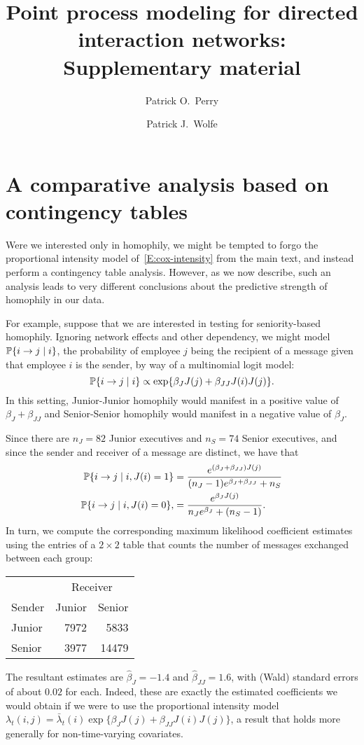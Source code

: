 \documentclass[final]{statsoc}
\title[Point Process Modeling for Directed Interaction Networks: Supplementary Material]{%
    Point process modeling for directed interaction networks: Supplementary material
}
\author[P.\ O.\ Perry]{%
    Patrick O.\ Perry
}
\author[P.\ J.\ Wolfe]{%
    Patrick J.\ Wolfe
}
\begin{document}

\section{A comparative analysis based on contingency tables}
\label{sec:contin-analysis}

Were we interested only in homophily, we might be tempted to forgo
the proportional intensity model of~\eqref{E:cox-intensity} from the main text, and instead
perform a contingency table analysis.  However, as we now describe,
such an analysis leads to very different conclusions
about the predictive strength of homophily in our data.

For example, suppose that we are interested in testing for seniority-based homophily.  Ignoring
network effects and other dependency, we might model $\mathbb{P}\{ i \to j \mid i
\}$, the probability of employee $j$ being the recipient of a message given
that employee $i$ is the sender, by way of a multinomial logit model:
\[
  \mathbb{P}\{ i \to j \mid i \}
    \propto \exp\{ \beta_J J(j) + \beta_{JJ} J(i) J(j) \}.
\]
In this setting,
Junior-Junior homophily would manifest in a positive value of
$\beta_{J} + \beta_{JJ}$ and Senior-Senior homophily would manifest in
a negative value of $\beta_J$.

Since there are $n_J = 82$ Junior
executives and $n_S = 74$ Senior executives, and since the sender and
receiver of a message are distinct, we have that
\begin{align*}
  \mathbb{P}\{ i \to j \mid i, J(i) = 1 \}
    &=
      \frac{e^{(\beta_J + \beta_{JJ}) J(j)}}
           {(n_J - 1) e^{\beta_J + \beta_{JJ}} + n_S} \\
  \mathbb{P}\{ i \to j \mid i, J(i) = 0 \},
    &=
      \frac{e^{\beta_J J(j)}}
           {n_J e^{\beta_J} + (n_S - 1)}.
\end{align*}
In turn, we compute the corresponding maximum likelihood coefficient estimates using the
entries of a $2 \times 2$ table that counts the number of messages exchanged
between each group:
\begin{center}
\begin{tabular}{lrr}
  \toprule
  & \multicolumn{2}{c}{Receiver} \\
  \cmidrule(l){2-3}
  Sender & Junior & Senior \\
  \midrule
  Junior &  7972  &  5833 \\
  Senior &  3977  & 14479 \\
  \bottomrule
\end{tabular}
\end{center}
The resultant estimates are $\hat \beta_{J} = -1.4$ and
$\hat \beta_{JJ} = 1.6$, with (Wald) standard errors of about $0.02$
for each.  Indeed, these are exactly the estimated coefficients we would
obtain if we were to use the proportional intensity model
$\lambda_t(i,j) = \bar \lambda_t(i) \exp\{ \beta_J J(j) + \beta_{JJ} J(i) J(j)
\}$, a result that holds more generally for non-time-varying covariates.
\end{document}
